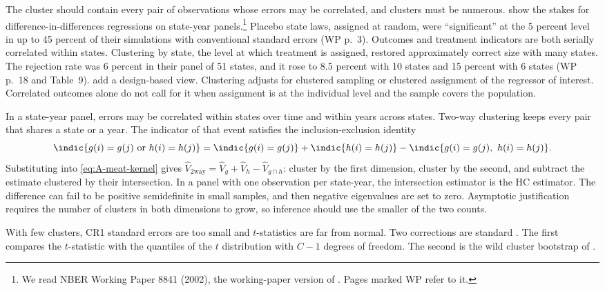The cluster should contain every pair of observations whose errors may be correlated, and clusters must be
numerous. \citet{BertrandDufloMullainathan2004} show the stakes for difference-in-differences regressions on
state-year panels.\footnote{We read NBER Working Paper 8841 (2002), the working-paper version of
\citet{BertrandDufloMullainathan2004}. Pages marked WP refer to it.} Placebo state laws, assigned at random, were
``significant'' at the 5 percent level in up to 45 percent of their simulations with conventional standard errors
(WP p.~3). Outcomes and treatment indicators are both serially correlated within states. Clustering by state, the
level at which treatment is assigned, restored approximately correct size with many states. The rejection rate was
6 percent in their panel of 51 states, and it rose to 8.5 percent with 10 states and 15 percent with 6 states (WP p.~18 and Table~9).
\citet{AbadieEtAl2023} add a design-based view. Clustering adjusts for
clustered sampling or clustered assignment of the regressor of interest. Correlated outcomes alone do not call for it
when assignment is at the individual level and the sample covers the population.

In a state-year panel, errors may be correlated within states over time and within years across states. Two-way
clustering \citep{CameronGelbachMiller2011} keeps every pair that shares a state or a year. The indicator of that
event satisfies the inclusion-exclusion identity
\begin{equation*}
  \indic\{g(i) = g(j) \text{ or } h(i) = h(j)\} = \indic\{g(i) = g(j)\} + \indic\{h(i) = h(j)\}
  - \indic\{g(i) = g(j),\ h(i) = h(j)\}.
\end{equation*}
Substituting into \eqref{eq:A-meat-kernel} gives $\hat V_{\text{2way}} = \hat V_g + \hat V_h - \hat V_{g \cap h}$:
cluster by the first dimension, cluster by the second, and subtract the estimate clustered by their intersection. In a
panel with one observation per state-year, the intersection estimator is the HC estimator. The difference can fail to
be positive semidefinite in small samples, and then negative eigenvalues are set to zero. Asymptotic justification
requires the number of clusters in both dimensions to grow, so inference should use the smaller of the two counts.

With few clusters, CR1 standard errors are too small and $t$-statistics are far from normal. Two corrections are
standard \citep{CameronMiller2015}. The first compares the $t$-statistic with the quantiles of the $t$ distribution
with $C - 1$ degrees of freedom. The second is the wild cluster bootstrap of \citet{CameronGelbachMiller2008}.

